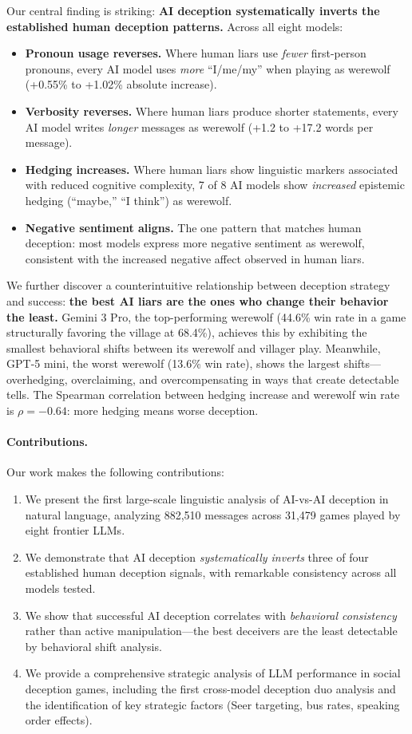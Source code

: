 Our central finding is striking: \textbf{AI deception systematically inverts the established human deception patterns.} Across all eight models:
\begin{itemize}
    \item \textbf{Pronoun usage reverses.} Where human liars use \emph{fewer} first-person pronouns, every AI model uses \emph{more} ``I/me/my'' when playing as werewolf (+0.55\% to +1.02\% absolute increase).
    \item \textbf{Verbosity reverses.} Where human liars produce shorter statements, every AI model writes \emph{longer} messages as werewolf (+1.2 to +17.2 words per message).
    \item \textbf{Hedging increases.} Where human liars show linguistic markers associated with reduced cognitive complexity, 7 of 8 AI models show \emph{increased} epistemic hedging (``maybe,'' ``I think'') as werewolf.
    \item \textbf{Negative sentiment aligns.} The one pattern that matches human deception: most models express more negative sentiment as werewolf, consistent with the increased negative affect observed in human liars.
\end{itemize}

We further discover a counterintuitive relationship between deception strategy and success: \textbf{the best AI liars are the ones who change their behavior the least.} Gemini 3 Pro, the top-performing werewolf (44.6\% win rate in a game structurally favoring the village at 68.4\%), achieves this by exhibiting the smallest behavioral shifts between its werewolf and villager play. Meanwhile, GPT-5 mini, the worst werewolf (13.6\% win rate), shows the largest shifts---overhedging, overclaiming, and overcompensating in ways that create detectable tells. The Spearman correlation between hedging increase and werewolf win rate is $\rho = -0.64$: more hedging means worse deception.

\paragraph{Contributions.} Our work makes the following contributions:
\begin{enumerate}
    \item We present the first large-scale linguistic analysis of AI-vs-AI deception in natural language, analyzing 882,510 messages across 31,479 games played by eight frontier LLMs.
    \item We demonstrate that AI deception \emph{systematically inverts} three of four established human deception signals, with remarkable consistency across all models tested.
    \item We show that successful AI deception correlates with \emph{behavioral consistency} rather than active manipulation---the best deceivers are the least detectable by behavioral shift analysis.
    \item We provide a comprehensive strategic analysis of LLM performance in social deception games, including the first cross-model deception duo analysis and the identification of key strategic factors (Seer targeting, bus rates, speaking order effects).
\end{enumerate}

